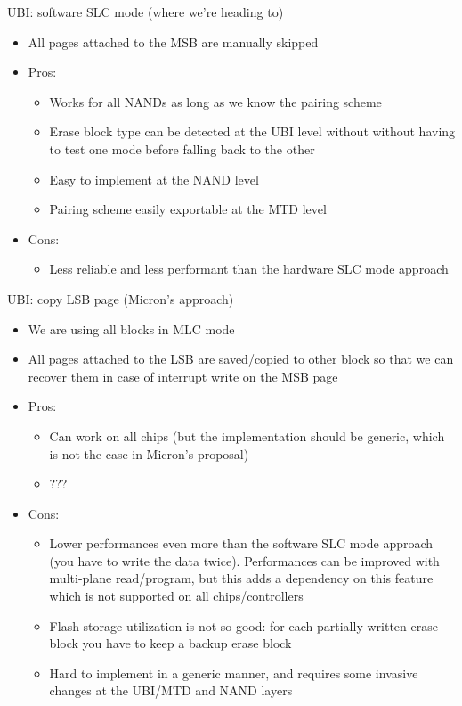 \documentclass[obeyspaces,spaces,hyphens,dvipsnames]{beamer}
\begin{document}
\begin{frame}{UBI: software SLC mode (where we're heading to)}
  \begin{itemize}
  \item All pages attached to the MSB are manually skipped
  \item Pros:
    \begin{itemize}
    \item Works for all NANDs as long as we know the pairing scheme
    \item Erase block type can be detected at the UBI level without
          without having to test one mode before falling back to the
	  other
    \item Easy to implement at the NAND level
    \item Pairing scheme easily exportable at the MTD level
    \end{itemize}
  \item Cons:
    \begin{itemize}
    \item Less reliable and less performant than the hardware SLC
          mode approach
    \end{itemize}
  \end{itemize}
\end{frame}

\begin{frame}{UBI: copy LSB page (Micron's approach)}
  \begin{itemize}
  \item We are using all blocks in MLC mode
  \item All pages attached to the LSB are saved/copied to other block
        so that we can recover them in case of interrupt write on the
	MSB page
  \item Pros:
    \begin{itemize}
    \item Can work on all chips (but the implementation should be
          generic, which is not the case in Micron's proposal)
    \item ???
    \end{itemize}
  \item Cons:
    \begin{itemize}
    \item Lower performances even more than the software SLC mode
          approach (you have to write the data twice). Performances
	  can be improved with multi-plane read/program, but this adds
	  a dependency on this feature which is not supported on all
	  chips/controllers
    \item Flash storage utilization is not so good: for each partially
          written erase block you have to keep a backup erase block
    \item Hard to implement in a generic manner, and requires some
          invasive changes at the UBI/MTD and NAND layers
    \end{itemize}
  \end{itemize}
\end{frame}
\end{document}
